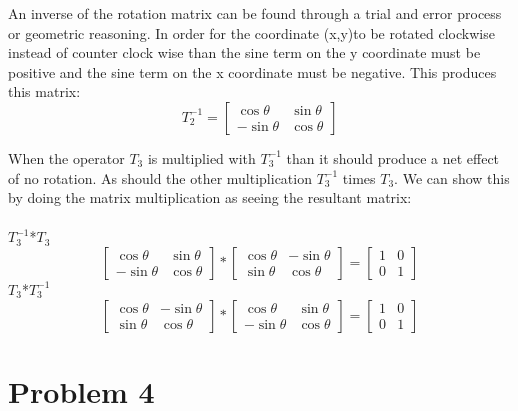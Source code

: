 \documentclass[12pt]{article}
\begin{document}
An inverse of the rotation matrix can be found through a trial and error process or geometric reasoning. In order for the coordinate (x,y)to be rotated clockwise instead of counter clock wise than the sine term on the y coordinate must be positive and the sine term on the x coordinate must be negative. This produces this matrix:
\[
T_{2}^{-1} =
\begin{bmatrix}
\cos \theta & \sin \theta\\
- \sin \theta & \cos \theta
\end{bmatrix}
\]

When the operator $T_{3}$ is multiplied with $T_{3}^{-1}$ than it should produce a net effect of no rotation. As should the other multiplication $T_{3}^{-1}$ times $T_{3}$. We can show this by doing the matrix multiplication as seeing the resultant matrix:\\
\\
$T_{3}^{-1}$*$T_{3}$
\[
\begin{bmatrix}
\cos \theta & \sin \theta\\
- \sin \theta & \cos \theta
\end{bmatrix}
*
\begin{bmatrix}
\cos \theta & -\sin \theta\\
\sin \theta & \cos \theta
\end{bmatrix}
=
\begin{bmatrix}
1 & 0\\
0 & 1
\end{bmatrix}
\]
$T_{3}$*$T_{3}^{-1}$
\[
\begin{bmatrix}
\cos \theta & -\sin \theta\\
\sin \theta & \cos \theta
\end{bmatrix}
*
\begin{bmatrix}
\cos \theta & \sin \theta\\
- \sin \theta & \cos \theta
\end{bmatrix}
=
\begin{bmatrix}
1 & 0\\
0 & 1
\end{bmatrix}
\]



\section{Problem 4}
\end{document}

